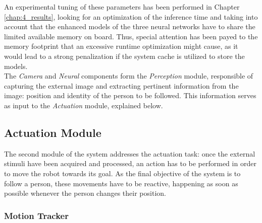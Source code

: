 An experimental tuning of these parameters has been performed in Chapter \ref{chap:4_results}, looking for an optimization of the inference time and taking into account that the enhanced models of the three neural networks have to share the limited available memory on board. Thus, special attention has been payed to the memory footprint that an excessive runtime optimization might cause, as it would lead to a strong penalization if the system cache is utilized to store the models.\\


The \textit{Camera} and \textit{Neural} components form the \textit{Perception} module, responsible of capturing the external image and extracting pertinent information from the image: position and identity of the person to be followed. This information serves as input to the \textit{Actuation} module, explained below.


\subsection{Actuation Module}
\label{sec:3_actuation}
The second module of the system addresses the actuation task: once the external stimuli have been acquired and processed, an action has to be performed in order to move the robot towards its goal. As the final objective of the system is to follow a person, these movements have to be reactive, happening as soon as possible whenever the person changes their position.\\

\subsubsection{Motion Tracker}


